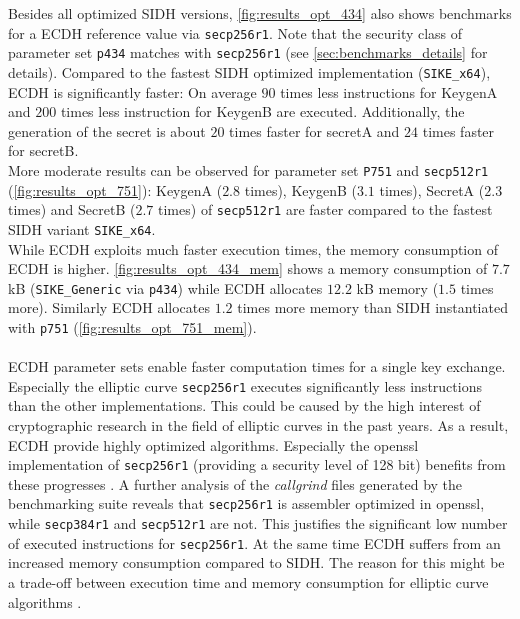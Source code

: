 Besides all optimized \gls{SIDH} versions, \autoref{fig:results_opt_434} also shows benchmarks for a \gls{ECDH} reference value via \texttt{secp256r1}. Note that the security class of parameter set \texttt{p434} matches with \texttt{secp256r1} (see \autoref{sec:benchmarks_details} for details). Compared to the fastest \gls{SIDH} optimized implementation (\texttt{SIKE\_x64}), \gls{ECDH} is significantly faster: On average $90$ times less instructions for KeygenA and $200$ times less instruction for KeygenB are executed. Additionally, the generation of the secret is about $20$ times faster for secretA and $24$ times faster for secretB.\\
More moderate results can be observed for parameter set \texttt{P751} and \texttt{secp512r1} (\autoref{fig:results_opt_751}): KeygenA ($2.8$ times),  KeygenB ($3.1$ times), SecretA ($2.3$ times) and SecretB ($2.7$ times) of \texttt{secp512r1} are faster compared to the fastest \gls{SIDH} variant \texttt{SIKE\_x64}.
\\
While \gls{ECDH} exploits much faster execution times, the memory consumption of \gls{ECDH} is higher.  \autoref{fig:results_opt_434_mem} shows a memory consumption of $7.7$ \gls{kB} (\texttt{SIKE\_Generic} via \texttt{p434}) while \gls{ECDH} allocates $12.2$ \gls{kB} memory ($1.5$ times more). Similarly \gls{ECDH} allocates $1.2$ times more memory than \gls{SIDH} instantiated with \texttt{p751} (\autoref{fig:results_opt_751_mem}).
\\\\
\gls{ECDH} parameter sets enable faster computation times for a single key exchange.
Especially the elliptic curve \texttt{secp256r1} executes significantly less instructions than the other implementations. This could be caused by the high interest of cryptographic research in the field of elliptic curves in the past years. As a result, \gls{ECDH} provide highly optimized algorithms. Especially the \gls{openssl} implementation of \texttt{secp256r1} (providing a security level of 128 bit) benefits from these progresses \parencite{adalier2015efficient}. A further analysis of the \textit{callgrind} files generated by the benchmarking suite reveals that \texttt{secp256r1} is assembler optimized in \gls{openssl}, while \texttt{secp384r1} and \texttt{secp512r1} are not. This justifies the significant low number of executed instructions for \texttt{secp256r1}. At the same time \gls{ECDH} suffers from an increased memory consumption compared to \gls{SIDH}. The reason for this might be a trade-off between execution time and memory consumption for elliptic curve algorithms \parencite{adalier2015efficient}.


